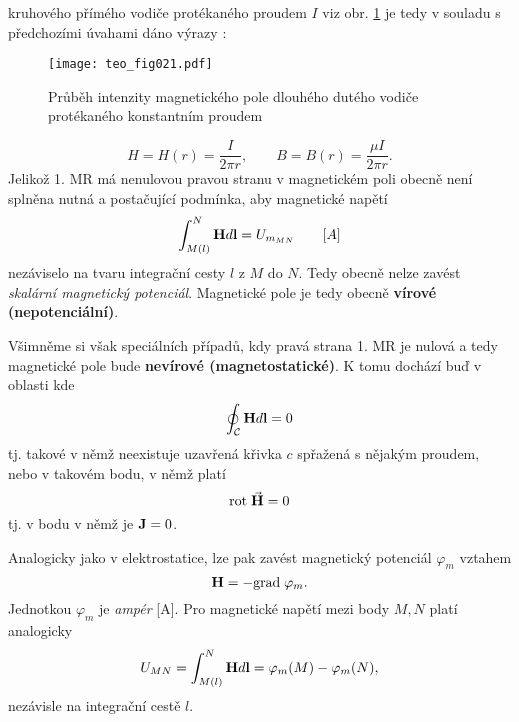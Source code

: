     kruhové\-ho přímého vodiče protékaného proudem $I$ viz obr. \ref{teo:fig021} je tedy v souladu 
    s předchozími úvahami dáno výrazy \cite[s.~183 - 185]{Kotlan1999}:
    \begin{figure}[ht!]
      \centering
      \texttt{[image: teo\_fig021.pdf]}
      \caption[Průběh intenzity magnetického pole dlouhého dutého vodiče protékaného konstantním
               proudem]{Průběh intenzity magnetického pole dlouhého dutého vodiče protékaného
               konstantním proudem}
      \label{teo:fig021}
    \end{figure}      
      \begin{equation}\label{TEMP:eq_Hr_Br_vodice}
        H = H(r) = \frac{I}{2\pi r}, \qquad B = B(r) = \frac{\mu I}{2\pi r}.
      \end{equation}   
    Jelikož 1. MR má nenulovou pravou stranu v magnetickém poli obecně není splněna nutná a
    postačující podmínka, aby magnetické napětí
      \begin{equation}\label{TEMP:eq_mag_napeti}
        \int_{M(l)}^N\mathbf{H}d\mathbf{l} = U_{m_{MN}} \qquad [A]
      \end{equation}       
    nezáviselo na tvaru integrační cesty $l$ z $M$ do $N$. Tedy obecně nelze zavést \emph{skalární
    magnetický potenciál}. Magnetické pole je tedy obecně \textbf{vírové (nepotenciální)}.

    Všimněme si však speciálních případů, kdy pravá strana 1. MR je nulová a tedy magnetické pole
    bude \textbf{nevírové (magnetostatické)}. K tomu dochází buď v oblasti kde 
      \begin{equation}\label{TEMP:eq_1MR_0}
        \oint_{\mathcal{C}}\mathbf{H}d\mathbf{l} = 0
      \end{equation}    
    tj. takové v němž neexistuje uzavřená křivka $c$ spřažená s nějakým proudem, nebo v takovém
    bodu, v němž platí
      \begin{equation}\label{TEMP:eq_rotH_0}
        \mathrm{rot}\;\vec{\mathbf{H}} = 0
      \end{equation}
    tj. v bodu v němž je $\mathbf{J} = 0$.
    
    Analogicky jako v elektrostatice, lze pak zavést magnetický potenciál $\varphi_m$ vztahem  
      \begin{equation}\label{TEMP:eq_grad_varphi_m}
        \mathbf{H} = - \mathrm{grad\;}\varphi_m.
      \end{equation}              
    Jednotkou $\varphi_m$ je \emph{ampér} [A]. Pro magnetické napětí mezi body $M, N$ platí
    analogicky
      \begin{equation}\label{TEMP:eq_Umn_def}
        U_{MN} = \int_{M(l)}^N\mathbf{H}d\mathbf{l} = \varphi_m(M) - \varphi_m(N),
      \end{equation}        
    nezávisle na integrační cestě $l$. 
     
